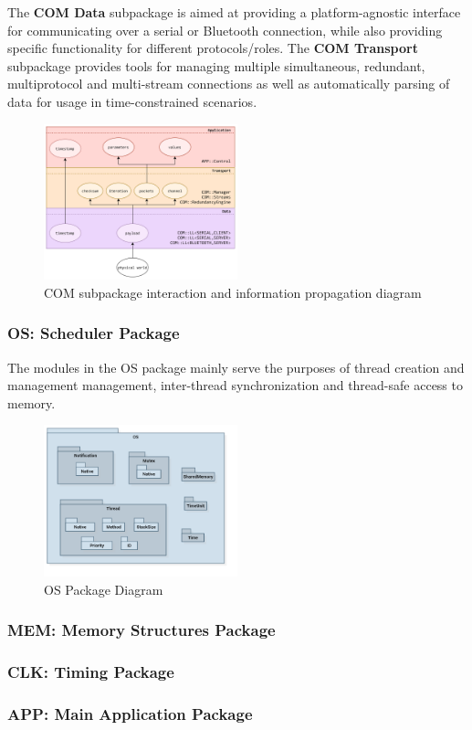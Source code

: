 The \textbf{COM Data} subpackage is aimed at providing a platform-agnostic interface for communicating over a serial or Bluetooth connection, while also providing specific functionality for different protocols/roles.
The \textbf{COM Transport} subpackage provides tools for managing multiple simultaneous, redundant, multiprotocol and multi-stream connections as well as automatically parsing of data for usage in time-constrained scenarios.

\begin{figure}[H]
	\centering
	\includegraphics[width=0.5\textwidth]{./img/module-stack-com.png}
	\caption {COM subpackage interaction and information propagation diagram}
	\label{fig:navig-module-stack-com}
	\end{figure}
	

\subsubsection{OS: Scheduler Package}

The modules in the OS package mainly serve the purposes of thread creation and management management, inter-thread synchronization and thread-safe access to memory.

\begin{figure}[H]
	\centering
	\includegraphics[width=0.5\textwidth]{./img/package-diagram-os.png}
	\caption {OS Package Diagram}
	\label{fig:navig-package-diagram-os}
	\end{figure}



\subsubsection{MEM: Memory Structures Package}
\subsubsection{CLK: Timing Package}
\subsubsection{APP: Main Application Package}

